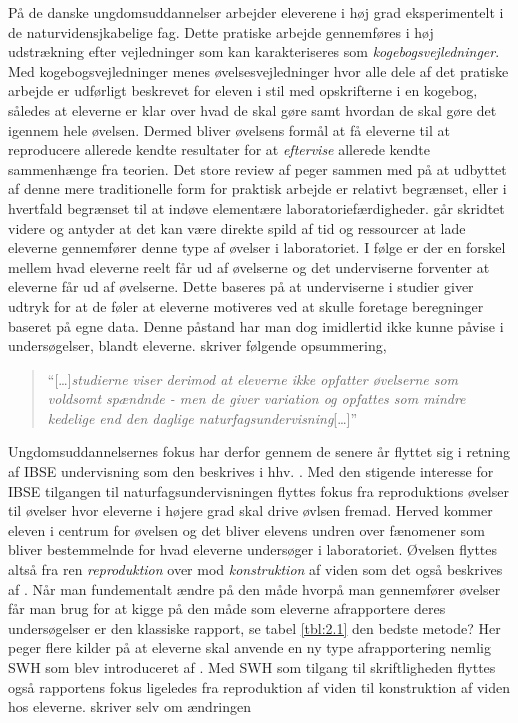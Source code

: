 På de danske ungdomsuddannelser arbejder eleverene i høj grad eksperimentelt i de naturvidensjkabelige fag. Dette pratiske arbejde gennemføres i høj udstrækning efter vejledninger som kan karakteriseres som \emph{kogebogsvejledninger}. Med kogebogsvejledninger menes øvelsesvejledninger hvor alle dele af det pratiske arbejde er udførligt beskrevet for eleven i stil med opskrifterne i en kogebog, således at eleverne er klar over hvad de skal gøre samt hvordan de skal gøre det igennem hele øvelsen. Dermed bliver øvelsens formål at få eleverne til at reproducere allerede kendte resultater for at \emph{eftervise} allerede kendte sammenhænge fra teorien. Det store review af \citep{Miller2018} peger sammen med \citep{Hodson2008} på at udbyttet af denne mere traditionelle form for praktisk arbejde er relativt begrænset, eller i hvertfald begrænset til at indøve elementære laboratoriefærdigheder. \citep{Hodson2008} går skridtet videre og antyder at det kan være direkte spild af tid og ressourcer at lade eleverne gennemfører denne type af øvelser i laboratoriet.  I følge \citep{Hodson2008} er der en forskel mellem hvad eleverne reelt får ud af øvelserne  og det underviserne forventer at eleverne får ud af øvelserne. Dette baseres på at underviserne i studier giver udtryk for at de føler at eleverne motiveres ved at skulle foretage beregninger baseret på egne data. Denne påstand har man dog imidlertid ikke kunne påvise i undersøgelser, blandt eleverne. \citet{Krogh2016} skriver følgende opsummering,
\begin{quote}
``[\ldots]\emph{studierne viser derimod at eleverne ikke opfatter øvelserne som voldsomt spændnde - men de giver variation og opfattes som mindre kedelige end den daglige naturfagsundervisning}[\ldots]''
\end{quote}
Ungdomsuddannelsernes fokus har derfor gennem de senere år flyttet sig i retning af IBSE undervisning som den beskrives i hhv. \citep{Dolin2014, Krogh2016}. Med den stigende interesse for IBSE tilgangen til naturfagsundervisningen flyttes fokus fra reproduktions øvelser til øvelser hvor eleverne i højere grad skal drive øvlsen fremad. Herved kommer eleven i centrum for øvelsen og det bliver elevens undren over fænomener som bliver bestemmelnde for hvad eleverne undersøger i laboratoriet. Øvelsen flyttes altså fra ren \emph{reproduktion} over mod \emph{konstruktion} af viden som det også beskrives af \citep{Krogh2016}. Når man fundementalt ændre på den måde hvorpå man gennemfører øvelser får man brug for at kigge på den måde som eleverne afrapportere deres undersøgelser er den klassiske rapport, se tabel \vref{tbl:2.1} den bedste metode?  Her peger flere kilder \citep[m.fl.]{Burke2005, Erkol2010} på at eleverne skal anvende en ny type afrapportering nemlig SWH som blev introduceret af \citep{Keys1999}. Med SWH som tilgang til skriftligheden flyttes også rapportens fokus ligeledes fra reproduktion af viden til konstruktion af viden hos eleverne. \citet{Keys1999} skriver selv om ændringen 
